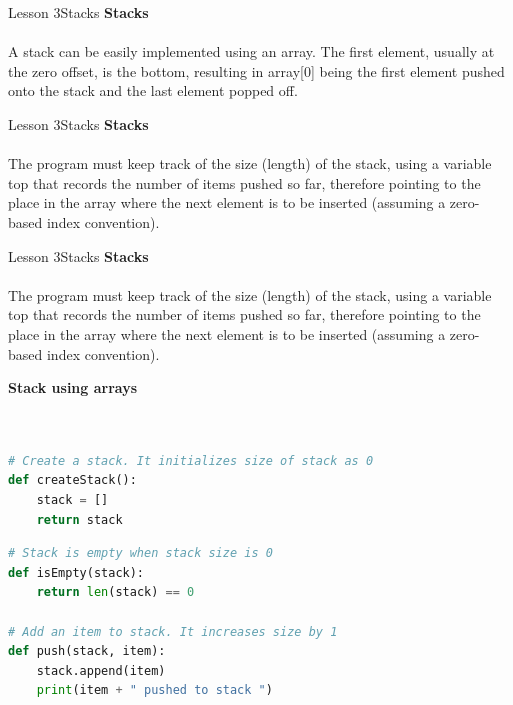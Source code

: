 \documentclass[aspectratio=1610]{beamer}
\begin{document}
\begin{frame}{Lesson 3}{Stacks}
\LARGE
\textbf{Stacks}\\~\\
A stack can be easily implemented using an array. The first
element, usually at the zero offset, is the bottom, resulting in
array[0] being the first element pushed onto the stack and the last
element popped off. 
\end{frame}

\begin{frame}{Lesson 3}{Stacks}
\LARGE
\textbf{Stacks}\\~\\
The program must keep track of the size (length) of the stack, using a variable 
top that records the number of items pushed so far, therefore pointing to the 
place in the array where the next element is to be inserted (assuming a zero-based 
index convention).
\end{frame}



\begin{frame}{Lesson 3}{Stacks}
\LARGE
\textbf{Stacks}\\~\\
The program must keep track of the size (length) of the stack, using
a variable top that records the number of items pushed so far,
therefore pointing to the place in the array where the next element
is to be inserted (assuming a zero-based index convention).
\end{frame}


\begin{frame}[fragile]
\Large
\textbf{Stack using arrays}\\~\\
\begin{lstlisting}[language=Python]

# Create a stack. It initializes size of stack as 0 
def createStack(): 
    stack = [] 
    return stack 
\end{lstlisting}
\end{frame}

\begin{frame}[fragile]
\Large
\begin{lstlisting}[language=Python]
# Stack is empty when stack size is 0 
def isEmpty(stack): 
    return len(stack) == 0

# Add an item to stack. It increases size by 1 
def push(stack, item): 
    stack.append(item) 
    print(item + " pushed to stack ")
 \end{lstlisting}
\end{frame} 
    
\end{document}
